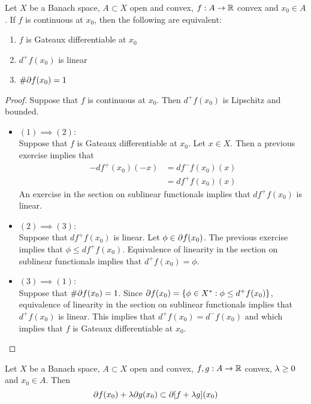 \documentclass{book}
\begin{document}
	\begin{ex} \lex{}
	Let $X$ be a Banach space, $A \subset X$ open and convex, $f:A \rightarrow \mathbb{R}$ convex and $x_0 \in A$. If $f$ is continuous at $x_0$, then the following are equivalent:
	\begin{enumerate}
	\item $f$ is Gateaux differentiable at $x_0$    
	\item $d^+f(x_0)$ is linear 
	\item $\# \partial f(x_0) = 1$
	\end{enumerate}
	\end{ex}	
	
	\begin{proof}
	Suppose that $f$ is continuous at $x_0$. Then $d^+f(x_0)$ is Lipschitz and bounded.
	\begin{itemize}
	\item $(1) \implies (2)$: \\ 
	Suppose that $f$ is Gateaux differentiable at $x_0$. Let $x \in X$. Then a previous exercise implies that 
	\begin{align*}
	-df^+(x_0)(-x) 
	&= df^-f(x_0)(x) \\
	&= df^+f(x_0)(x)
	\end{align*}
	An exercise in the section on sublinear functionals implies that $df^+f(x_0)$ is linear.
	\item $(2) \implies (3)$: \\  
	Suppose that $df^+f(x_0)$ is linear. Let $\phi \in \partial f(x_0)$. The previous exercise implies that $\phi \leq df^+f(x_0)$. Equivalence of linearity in the section on sublinear functionals implies that $d^+f(x_0) = \phi$. 
	\item $(3) \implies (1)$: \\  
	Suppose that $\# \partial f(x_0) = 1$. Since $\partial f(x_0) = \{ \phi \in X^*: \phi \leq d^+ f(x_0) \}$, equivalence of linearity in the section on sublinear functionals implies that $d^+ f(x_0)$ is linear. This implies that $d^+ f(x_0) = d^- f(x_0)$ and which implies that $f$ is Gateaux differentiable at $x_0$.
	\end{itemize}
	\end{proof}
	
	\begin{ex}
	Let $X$ be a Banach space, $A \subset X$ open and convex, $f,g:A \rightarrow \mathbb{R}$ convex, $\lambda \geq 0$ and $x_0 \in A$. Then $$\partial f(x_0) + \lambda \partial g(x_0) \subset \partial[f + \lambda g](x_0)$$
	\end{ex}
	
\end{document}
